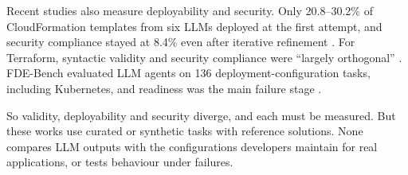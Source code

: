 Recent studies also measure deployability and security. Only 20.8--30.2\% of CloudFormation templates from six LLMs deployed at the first attempt, and security compliance stayed at 8.4\% even after iterative refinement \citep{zhang2026iacgen}. For Terraform, syntactic validity and security compliance were ``largely orthogonal'' \citep{santosvargas2026secureterraform}. FDE-Bench evaluated LLM agents on 136 deployment-configuration tasks, including Kubernetes, and readiness was the main failure stage \citep{ding2026fdebench}.

So validity, deployability and security diverge, and each must be measured. But these works use curated or synthetic tasks with reference solutions. None compares LLM outputs with the configurations developers maintain for real applications, or tests behaviour under failures.

